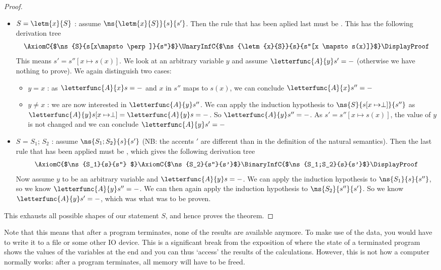 \begin{proof}
\begin{itemize}[noitemsep]
    \item  $S = \letm{x}{S}$ : assume $\ns{\letm{x}{S}}{s}{s'}$. Then the rule that has been aplied last must be . This has the following derivation tree 
    $$\AxiomC{$\ns{S}{s[x\mapsto \perp]}{s''}$}
\UnaryInfC{$\ns{\letm{x}{S}}{s}{s''[x \mapsto s(x)]}$}
\DisplayProof$$
This means $s' = s''[x \mapsto s(x)]$.
We look at an arbitrary variable $y$ and assume $\letterfunc{A}{y}s' = -$ (otherwise we have nothing to prove). We again distinguish two cases:
    \begin{itemize}[noitemsep]
        \item $y=x$ : as $\letterfunc{A}{x}s = -$ and $x$ in $s''$ maps to $s(x)$, we can conclude $\letterfunc{A}{x}s'' = -$
        \item $y\neq x$ : we are now interested in $\letterfunc{A}{y}s''$. We can apply the induction hypothesis to $\ns{S}{s[x\mapsto \perp]}{s''}$ as $\letterfunc{A}{y}s[x\mapsto \perp] = \letterfunc{A}{y}s = -$. So $\letterfunc{A}{y}s'' = -$. As $s' = s''[x \mapsto s(x)]$, the value of $y$ is not changed and we can conclude $\letterfunc{A}{y}s' = -$
    \end{itemize}
    \item $S$ = $S_1$; $S_2$ : assume $\ns{S_1;S_2}{s}{s'}$ (NB: the accents $'$ are different than in the definition of the natural semantics). Then the last rule that has been applied must be \compns, which gives the following derivation tree 
    $$\AxiomC{$\ns{S_1}{s}{s''} $}
\AxiomC{$\ns{S_2}{s''}{s'}$}
\BinaryInfC{$\ns{S_1;S_2}{s}{s'}$}
\DisplayProof$$
Now assume $y$ to be an arbitrary variable and $\letterfunc{A}{y}s = -$. We can apply the induction hypothesis to $\ns{S_1}{s}{s''}$, so we know $\letterfunc{A}{y}s'' = -$. We can then again apply the induction hypothesis to $\ns{S_2}{s''}{s'}$. So we know $\letterfunc{A}{y}s' = -$, which was what was to be proven.
\end{itemize} 
This exhausts all possible shapes of our statement $S$, and hence proves the theorem.
\end{proof}

Note that this means that after a program terminates, none of the results are available anymore. To make use of the data, you would have to write it to a file or some other IO device. This is a significant break from the exposition of \cite{nielson1992semantics} where the state of a terminated program shows the values of the variables at the end and you can thus `access' the results of the calculations. However, this is not how a computer normally works: after a program terminates, all memory will have to be freed. 

